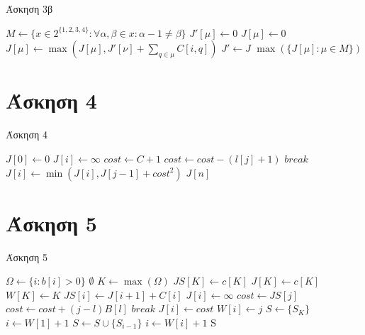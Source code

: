 \documentclass[11pt,a4paper]{book}
\begin{document}
\begin{algorithm}[H]
\caption{\textgreek{Άσκηση 3β}}
\begin{algorithmic}[1]
	\State $M \gets \{ x \in 2^{\{1, 2, 3, 4\}}: \forall \alpha, \beta \in x: \alpha - 1 \neq \beta \}$
		\State $J'[ \mu ] \gets 0$
	\EndFor
			\State $J[ \mu ] \gets 0$
				\If {$\nu \cap \mu = \emptyset$}
					\State $J[ \mu ] \gets \max( J[ \mu ], J'[ \nu ] + \sum_{q \in \mu}{C[ i, q ]} )$
				\EndIf
			\EndFor
		\EndFor
		\State $J' \gets J$
	\EndFor
	\State \Return $\max( \{ J[ \mu ]: \mu \in M \} )$
\EndProcedure
\end{algorithmic}
\end{algorithm}

\section*{Άσκηση 4}

\begin{algorithm}[H]
\caption{\textgreek{Άσκηση 4}}
\begin{algorithmic}[1]
	\State $J[ 0 ] \gets 0$
		\State $J[ i ] \gets \infty$
		\State $cost \gets C + 1$
			\State $cost \gets cost - ( l[ j ] + 1 )$
				\State $break$
			\EndIf
			\State $J[ i ] \gets \min( J[ i ], J[j - 1] + cost^2 )$
		\EndFor
	\EndFor
	\State \Return $J[ n ]$
\EndProcedure
\end{algorithmic}
\end{algorithm}

\section*{Άσκηση 5}
\begin{algorithm}[H]
\caption{\textgreek{Άσκηση 5}}
\begin{algorithmic}[1]
	\State $\Omega \gets \{ i: b[ i ] > 0 \}$
	\If {$\Omega = \emptyset$}
		\State \Return $\emptyset$
	\EndIf
	\State $K \gets \max( \Omega )$
	\State $JS[ K ] \gets c[ K ]$
	\State $J[ K ] \gets c[ K ]$
	\State $W[ K ] \gets K$
		\State $JS[ i ] \gets J[ i + 1 ] + C[ i ]$
		\State $J[ i ] \gets \infty$
			\State $cost \gets JS[ j ]$
				\State $cost \gets cost + ( j - l )B[ l ]$
					\State $break$
				\EndIf
			\EndFor
				\State $J[ i ] \gets cost$
				\State $W[ i ] \gets j$
			\EndIf
		\EndFor
	\EndFor
	\State $S \gets \{ S_K \}$
	\State $i \gets W[ 1 ] + 1$
		\State $S \gets S \cup \{ S_{i - 1} \}$
		\State $i \gets W[ i ] + 1$
	\EndWhile
	\State \Return S
\EndProcedure
\end{algorithmic}
\end{algorithm}
\end{document}
